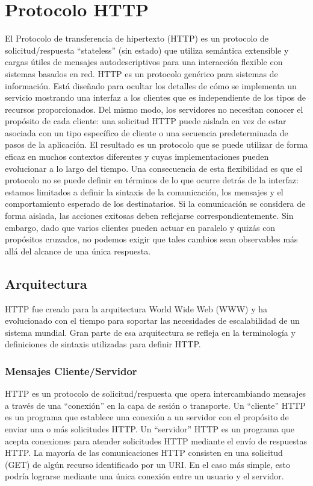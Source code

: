 \section{Protocolo HTTP}

El Protocolo de transferencia de hipertexto (HTTP) es un protocolo de 
solicitud/respuesta “stateless” (sin estado) que utiliza semántica 
extensible y cargas útiles de mensajes autodescriptivos para una 
interacción flexible con sistemas basados en red.
   HTTP es un protocolo genérico para sistemas de información. Está 
   diseñado para ocultar los detalles de cómo se implementa un servicio 
   mostrando una interfaz a los clientes que es independiente de los 
   tipos de recursos proporcionados. Del mismo modo, los servidores 
   no necesitan conocer el propósito de cada cliente: una solicitud 
   HTTP puede aislada en vez de estar asociada con un tipo específico
    de cliente o una secuencia predeterminada de pasos de la aplicación.
     El resultado es un protocolo que se puede utilizar de forma eficaz 
     en muchos contextos diferentes y cuyas implementaciones pueden
      evolucionar a lo largo del tiempo.
   Una consecuencia de esta flexibilidad es que el protocolo no 
   se puede definir en términos de lo que ocurre detrás de la 
   interfaz: estamos limitados a definir la sintaxis de la comunicación, 
   los mensajes y el comportamiento esperado de los destinatarios. 
   Si la comunicación se considera de forma aislada, las acciones 
   exitosas deben reflejarse correspondientemente. Sin embargo, 
   dado que varios clientes pueden actuar en paralelo y quizás con
    propósitos cruzados, no podemos exigir que tales cambios sean 
    observables más allá del alcance de una única respuesta.
   
\subsection{Arquitectura}
HTTP fue creado para la arquitectura World Wide Web (WWW) y ha 
evolucionado con el tiempo para soportar las necesidades de
 escalabilidad de un sistema mundial. Gran parte de esa arquitectura 
 se refleja en la terminología y  definiciones de sintaxis utilizadas 
 para definir HTTP.

\subsubsection*{Mensajes Cliente/Servidor}


HTTP es un protocolo de solicitud/respuesta que opera intercambiando 
mensajes a través de una ``conexión'' en la capa de sesión o transporte.
 Un “cliente” HTTP es un programa que establece una conexión a un 
 servidor con el propósito de enviar una o más solicitudes HTTP. 
 Un “servidor” HTTP es un programa que acepta conexiones para
  atender solicitudes HTTP mediante el envío de respuestas HTTP. 
  La mayoría de las comunicaciones HTTP consisten en una solicitud
   (GET) de algún recurso identificado por un URI. En el caso más 
   simple, esto podría lograrse mediante una única conexión entre un
    usuario y el servidor.

